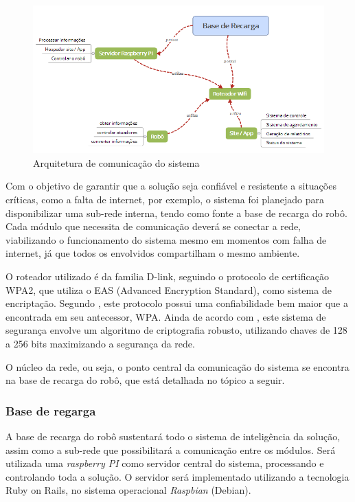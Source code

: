	\begin{figure}[H]
		\centering
		\includegraphics[scale=0.8]{figuras/arquitetura_comunicacao.png}
		\caption{Arquitetura de comunicação do sistema}
		\label{img:arq_comu}
	\end{figure}

	Com o objetivo de garantir que a solução seja confiável e resistente a situações críticas, como a falta de internet, por exemplo, o sistema foi planejado para disponibilizar uma sub-rede interna, tendo como fonte a base de recarga do robô. Cada módulo que necessita de comunicação deverá se conectar a rede, viabilizando o funcionamento do sistema mesmo em momentos com falha de internet, já que todos os envolvidos compartilham o mesmo ambiente.

	O roteador utilizado é da familia D-link, seguindo o protocolo de certificação WPA2, que utiliza o EAS (Advanced Encryption Standard), como sistema de encriptação. Segundo \cite{wpa2}, este protocolo possui uma confiabilidade bem maior que a encontrada em seu antecessor, WPA. Ainda de acordo com \cite{wpa2}, este sistema de segurança envolve um algoritmo de criptografia robusto, utilizando chaves de 128 a 256 bits maximizando a segurança da rede.

	O núcleo da rede, ou seja, o ponto central da comunicação do sistema se encontra na base de recarga do robô, que está detalhada no tópico a seguir.

	\subsubsection{Base de regarga}

	A base de recarga do robô sustentará todo o sistema de inteligência da solução, assim como a sub-rede que possibilitará a comunicação entre os módulos. Será utilizada uma \textit{raspberry PI} como servidor central do sistema, processando e controlando toda a solução. O servidor será implementado utilizando a tecnologia Ruby on Rails, no sistema operacional \textit{Raspbian} (Debian).

